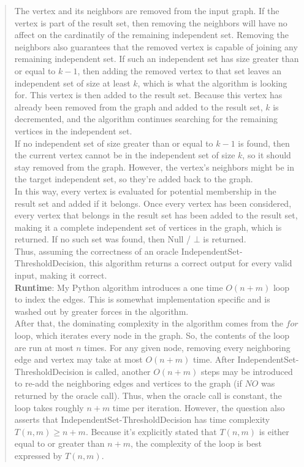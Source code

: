 \documentclass[11pt]{article}
\begin{document}
\begin{enumerate}
\begin{enumerate}
\begin{quote}
    The vertex and its neighbors are removed from the input graph. If the vertex is part of the result set, then removing the neighbors will have no affect on the cardinatily of the remaining independent set. Removing the neighbors also guarantees that the removed vertex is capable of joining any remaining independent set. If such an independent set has size greater than or equal to $k - 1$, then adding the removed vertex to that set leaves an independent set of size at least $k$, which is what the algorithm is looking for. This vertex is then added to the result set. Because this vertex has already been removed from the graph and added to the result set, $k$ is decremented, and the algorithm continues searching for the remaining vertices in the independent set. \\
    
    If no independent set of size greater than or equal to $k - 1$ is found, then the current vertex cannot be in the independent set of size $k$, so it should stay removed from the graph. However, the vertex's neighbors might be in the target independent set, so they're added back to the graph. \\
    
    In this way, every vertex is evaluated for potential membership in the result set and added if it belongs. Once every vertex has been considered, every vertex that belongs in the result set has been added to the result set, making it a complete independent set of vertices in the graph, which is returned. If no such set was found, then Null / $\bot$ is returned. \\
    
    Thus, assuming the correctness of an oracle IndependentSet-ThresholdDecision, this algorithm returns a correct output for every valid input, making it correct. \\

    \textbf{Runtime}: \newline 
    My Python algorithm introduces a one time $O(n + m)$ loop to index the edges. This is somewhat implementation specific and is washed out by greater forces in the algorithm. \\

    After that, the dominating complexity in the algorithm comes from the $for$ loop, which iterates every node in the graph. So, the contents of the loop are run at most $n$ times. For any given node, removing every neighboring edge and vertex may take at most $O(n + m)$ time. After IndependentSet-ThresholdDecision is called, another $O(n + m)$ steps may be introduced to re-add the neighboring edges and vertices to the graph (if $NO$ was returned by the oracle call). Thus, when the oracle call is constant, the loop takes roughly $n + m$ time per iteration. However, the question also asserts that IndependentSet-ThresholdDecision has time complexity $T(n,m)\geq n+m$. Because it's explicitly stated that $T(n, m)$ is either equal to or greater than $n + m$, the complexity of the loop is best expressed by $T(n, m)$. \\ 


\end{quote}
\end{enumerate}
\end{enumerate}
\end{document}
